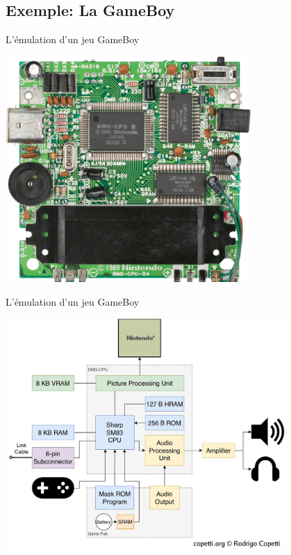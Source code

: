 \documentclass{beamer}
\begin{document}
    \subsection{Exemple: La GameBoy}
    \begin{frame}{L'émulation d'un jeu GameBoy}
        \begin{center}
            \includegraphics[width=0.7\textwidth]{images/carte_mere.png}
        \end{center}
    \end{frame}

    \begin{frame}{L'émulation d'un jeu GameBoy}
        \begin{center}
            \includegraphics[width=0.8\textwidth]{images/diagrame.png}
        \end{center}
    \end{frame}
\end{document}

